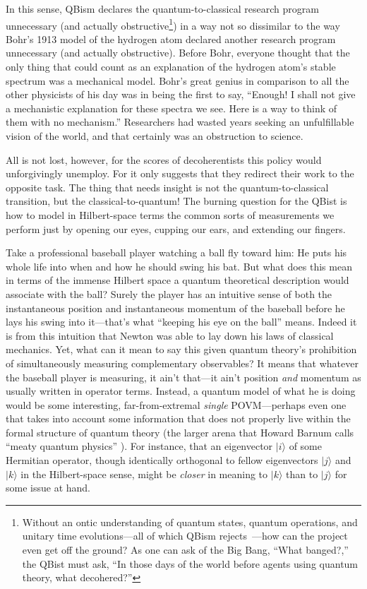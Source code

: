 \documentclass[aps,pra,superscriptaddress,12pt,tightenlines,nofootinbib]{revtex4-2}
\begin{document}
In this sense, QBism declares the quantum-to-classical research program unnecessary (and actually obstructive\footnote{Without an ontic understanding of quantum states, quantum operations, and unitary time evolutions---all of which QBism rejects~\cite{Fuchs02,RMP,Leifer06}---how can the project even get off the ground?  As one can ask of the Big Bang, ``What banged?,'' the QBist must ask, ``In those days of the world before agents using quantum theory, what decohered?''}) in a way not so dissimilar to the way Bohr's 1913 model of the hydrogen atom declared another research program unnecessary (and actually obstructive).  Before Bohr, everyone thought that the only thing that could count as an explanation of the hydrogen atom's stable spectrum was a mechanical model.  Bohr's great genius in comparison to all the other physicists of his day was in being the first to say, ``Enough!  I shall not give a mech\-anistic explanation for these spectra we see.  Here is a way to think of them with no mechanism.''  Researchers had wasted years seeking an unfulfillable vision of the world, and that certainly was an obstruction to science.

All is not lost, however, for the scores of decoherentists this policy would unforgivingly unemploy.  For it only suggests that they redirect their work to the opposite task.  The thing that needs insight is not the quantum-to-classical transition, but the classical-to-quantum!  The burning question for the QBist is how to model in Hilbert-space terms the common sorts of measurements we perform just by opening our eyes, cupping our ears, and extending our fingers.%

Take a professional baseball player watching a ball fly toward him:  He puts his whole life into when and how he should swing his bat.  But what does this mean in terms of the immense Hilbert space a quantum theoretical description would associate with the ball?  Surely the player has an intuitive sense of both the instantaneous position and instantaneous momentum of the baseball before he lays his swing into it---that's what ``keeping his eye on the ball'' means.  Indeed it is from this intuition that Newton was able to lay down his laws of classical mechanics.   Yet, what can it mean to say this given quantum theory's prohibition of simultaneously measuring complementary observables?  It means that whatever the baseball player is measuring, it ain't that---it ain't position {\it and\/} momentum as usually written in operator terms.  Instead, a quantum model of what he is doing would be some interesting, far-from-extremal {\it single\/} POVM---perhaps even one that takes into account some information that does not properly live within the formal structure of quantum theory (the larger arena that Howard Barnum calls ``meaty quantum physics'' \cite{Barnum10}). For instance, that an eigenvector $|i\rangle$ of some Hermitian operator, though identically orthogonal to fellow eigenvectors $|j\rangle$ and $|k\rangle$ in the Hilbert-space sense, might be {\it closer\/} in meaning to $|k\rangle$ than to $|j\rangle$ for some issue at hand.
\end{document}
